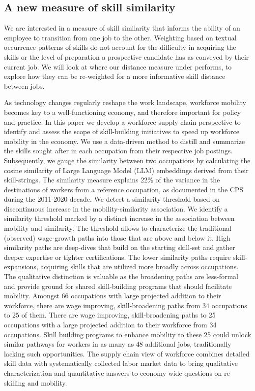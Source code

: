 \documentclass{article}
\begin{document}
 

\subsection{A new measure of skill similarity} 

We are interested in a measure of skill similarity that informs the ability of an employee to transition from one job to the other. Weighting based on textual occurrence patterns of skills do not account for the difficulty in acquiring the skills or the level of preparation a prospective candidate has as conveyed by their current job. We will look at where our distance measure under performs, to explore how they can be re-weighted for a more informative skill distance between jobs.




 As technology changes regularly reshape the work landscape, workforce mobility becomes key to a well-functioning economy, and therefore important for policy and practice. In this paper we develop a workforce supply-chain perspective to identify and assess the scope of skill-building initiatives to speed up workforce mobility in the economy. We use a data-driven method to distill and summarize the skills sought after in each occupation from their respective job postings. Subsequently, we gauge the similarity between two occupations by calculating the cosine similarity of Large Language Model (LLM) embeddings derived from their skill-strings. The similarity measure explains 22\% of the variance in the destinations of workers from a reference occupation, as documented in the CPS during the 2011-2020 decade. We detect a similarity threshold based on discontinuous increase in the mobility-similarity association. We identify a similarity threshold marked by a distinct increase in the association between mobility and similarity. The threshold allows to characterize the traditional (observed) wage-growth paths into those that are above and below it. High similarity paths are deep-dives that build on the starting skill-set and gather deeper expertise or tighter certifications. The lower similarity paths require skill-expansions, acquiring skills that are utilized more broadly across occupations. The qualitative distinction is valuable as the broadening paths are less-formal and provide ground for shared skill-building programs that should facilitate mobility. Amongst 66 occupations with large projected addition to their workforce, there are wage improving, skill-broadening paths from 34 occupations to 25 of them. There are wage improving, skill-broadening paths to 25 occupations with a large projected addition to their workforce from 34 occupations. Skill building programs to enhance mobility to these 25 could unlock similar pathways for workers in as many as 48 additional jobs, traditionally lacking such opportunities. The supply chain view of workforce combines detailed skill data with systematically collected labor market data to bring qualitative characterization and quantitative answers to economy-wide questions on re-skilling and mobility. 
 
\end{document}
